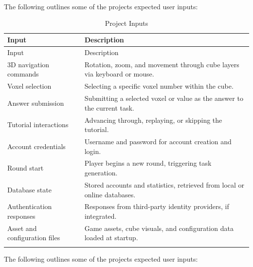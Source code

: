 \documentclass[12pt]{article}
\begin{document}
The following outlines some of the projects expected user inputs:

\begin{longtable}{p{} p{}}
\toprule
Input & Description\\
\midrule
\endfirsthead
\toprule
Input & Description\\
\midrule
\endhead
\endlastfoot
3D navigation commands & Rotation, zoom, and movement through cube layers via keyboard or mouse. \\
Voxel selection & Selecting a specific voxel number within the cube. \\
Answer submission & Submitting a selected voxel or value as the answer to the current task. \\
Tutorial interactions & Advancing through, replaying, or skipping the tutorial. \\
Account credentials & Username and password for account creation and login. \\
Round start & Player begins a new round, triggering task generation. \\
Database state & Stored accounts and statistics, retrieved from local or online databases. \\
Authentication responses & Responses from third-party identity providers, if integrated. \\
Asset and configuration files & Game assets, cube visuals, and configuration data loaded at startup. \\
\bottomrule
\caption{Project Inputs} \label{tab:ProjectInputs}
\end{longtable}

The following outlines some of the projects expected user inputs:
\end{document}
